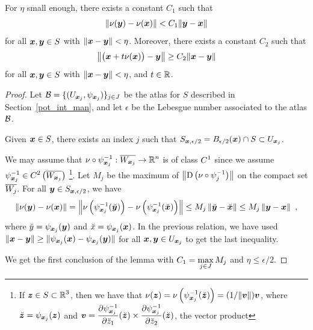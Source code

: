 \begin{lemma} \label{pot_inequ}
For $\eta$ small enough, there exists a constant $C_1$ such that
\[
\left\| \nu({\bm{y}}) - \nu({\bm{x}}) \right\| < C_1
\|{\bm{y}}-{\bm{x}}\|
\]
for all ${\bm{x}}, {\bm{y}} \in S$ with $\|{\bm{x}} - {\bm{y}}\|<\eta$.
Moreover, there exists a constant $C_2$ such that
\[
\left\| \big({\bm{x}} + t\nu({\bm{x}})\big) - {\bm{y}} \right\|
\geq C_2 \|{\bm{x}} - {\bm{y}}\|
\]
for all ${\bm{x}}, {\bm{y}} \in S$ with $\|{\bm{x}} - {\bm{y}}\|<\eta$,
and $t \in \mathbb{R}$.  
\end{lemma}

\begin{proof}
Let $\displaystyle \mathcal{B} = \{ (U_{{\bm{x}}_j}, \psi_{{\bm{x}}_j}) \}_{j\in J}$
be the atlas for $S$ described in Section~\ref{pot_int_man}, and
let $\epsilon$ be the Lebesgue number associated to the atlas $\mathcal{B}$.

Given ${\bm{x}} \in S$, there exists an index $j$ such that
$\displaystyle S_{{\bm{x}},\epsilon/2} = B_{\epsilon/2}({\bm{x}})
\cap S \subset U_{{\bm{x}}_j}$.

We may assume that
$\displaystyle \nu \circ \psi_{{\bm{x}}_j}^{-1}:
\overline{W_{{\bm{x}}_j}} \to \mathbb{R}^n$
is of class $\displaystyle C^1$ since we assume
$\displaystyle \psi_{{\bm{x}}_j}^{-1} \in
C^2\left(\overline{W_{{\bm{x}}_j}}\right)$
\footnote{If $\displaystyle {\bm{z}} \in S \subset \mathbb{R}^3$, then we have that
$\displaystyle \nu({\bm{z}})
= \nu\left(\psi_{{\bm{x}}_j}^{-1}(\breve{{\bm{z}}})\right)
= (1/\|{\bm{v}}\|) {\bm{v}}$, where
$\breve{{\bm{z}}} = \psi_{{\bm{x}}_j}({\bm{z}})$ and
$\displaystyle {\bm{v}} = \frac{\partial{\psi_{{\bm{x}}_j}^{-1}}}{\partial \breve{z}_1}(
\breve{{\bm{z}}})
\times \frac{\partial{\psi_{{\bm{x}}_j}^{-1}}}{\partial \breve{z}_2}(\breve{{\bm{z}}})$,
the vector product}.
Let $M_j$ be the maximum of
$\displaystyle \left\| \operatorname{D} \left(\nu \circ \psi_j^{-1}\right)\right\|$
on the compact set $\displaystyle \overline{W_j}$.  For all
${\bm{y}} \in S_{{\bm{x}},\epsilon/2}$, we have
\[
  \left\| \nu({\bm{y}}) - \nu({\bm{x}}) \right\|
= \left\| \nu\left(\psi_{{\bm{x}}_j}^{-1}(\breve{{\bm{y}}})\right) -
 \nu\left(\psi_{{\bm{x}}_j}^{-1}(\breve{{\bm{x}}})\right) \right\|
\leq M_j \left\| \breve{{\bm{y}}} - \breve{{\bm{x}}} \right\|
\leq M_j \left\| {\bm{y}} - {\bm{x}} \right\| \ ,
\]
where $\breve{y} = \psi_{{\bm{x}}_j}({\bm{y}})$ and
$\breve{x} = \psi_{{\bm{x}}_j}({\bm{x}})$.  In the previous relation, we
have used $\displaystyle \|{\bm{x}}-{\bm{y}}\| 
\geq \|\psi_{{\bm{x}}_j}({\bm{x}}) - \psi_{{\bm{x}}_j}({\bm{y}})\|$ for all
$\displaystyle {\bm{x}},{\bm{y}} \in U_{{\bm{x}}_j}$ to get the last
inequality.

We get the first conclusion of the lemma with
$\displaystyle C_1 = \max_{j \in J} M_j$ and $\eta \leq \epsilon /2$.


\end{proof}
